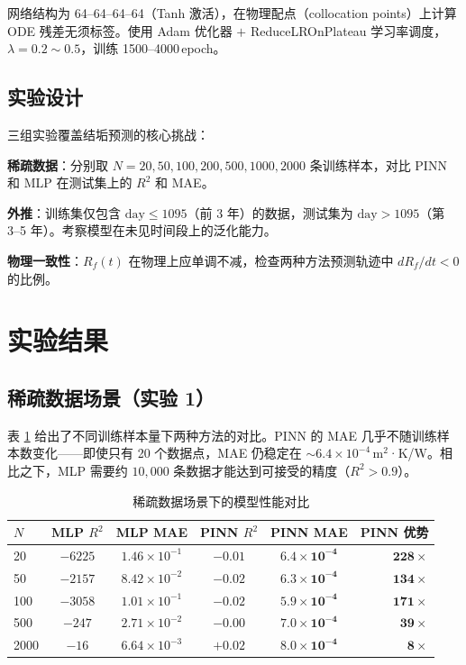 \documentclass[12pt,a4paper]{ctexart}
\begin{document}
网络结构为 64--64--64--64（Tanh 激活），在物理配点（collocation points）上计算 ODE 残差无须标签。使用 Adam 优化器 $+$ ReduceLROnPlateau 学习率调度，$\lambda=0.2\sim0.5$，训练 1500--4000\,epoch。

\subsection{实验设计}
\label{sec:exp_design}

三组实验覆盖结垢预测的核心挑战：

\begin{description}[leftmargin=!,labelwidth=4em,itemindent=0pt]
    \item[实验 1] \textbf{稀疏数据}：分别取 $N = 20, 50, 100, 200, 500, 1000, 2000$ 条训练样本，对比 PINN 和 MLP 在测试集上的 $R^2$ 和 MAE。
    \item[实验 2] \textbf{外推}：训练集仅包含 $\text{day} \leq 1095$（前 3 年）的数据，测试集为 $\text{day} > 1095$（第 3--5 年）。考察模型在未见时间段上的泛化能力。
    \item[实验 3] \textbf{物理一致性}：$R_f(t)$ 在物理上应单调不减，检查两种方法预测轨迹中 $dR_f/dt < 0$ 的比例。
\end{description}

\section{实验结果}
\label{sec:results}

\subsection{稀疏数据场景（实验 1）}

表 \ref{tab:sparse} 给出了不同训练样本量下两种方法的对比。PINN 的 MAE 几乎不随训练样本数变化——即使只有 20 个数据点，MAE 仍稳定在 $\sim 6.4\times10^{-4}$\,m$^2$·K/W。相比之下，MLP 需要约 $10{,}000$ 条数据才能达到可接受的精度（$R^2 > 0.9$）。

\begin{table}[htbp]
    \centering
    \caption{稀疏数据场景下的模型性能对比}
    \label{tab:sparse}
    \begin{tabular}{lccccr}
        \toprule
        $N$ & MLP $R^2$ & MLP MAE & PINN $R^2$ & PINN MAE & PINN 优势 \\
        \midrule
         20   & $-6225$  & $1.46\times10^{-1}$ & $-0.01$ & $\mathbf{6.4\times10^{-4}}$ & $\mathbf{228\times}$ \\
         50   & $-2157$  & $8.42\times10^{-2}$ & $-0.02$ & $\mathbf{6.3\times10^{-4}}$ & $\mathbf{134\times}$ \\
        100   & $-3058$  & $1.01\times10^{-1}$ & $-0.02$ & $\mathbf{5.9\times10^{-4}}$ & $\mathbf{171\times}$ \\
        500   & $-247$   & $2.71\times10^{-2}$ & $-0.00$ & $\mathbf{7.0\times10^{-4}}$ & $\mathbf{39\times}$  \\
       2000   & $-16$    & $6.64\times10^{-3}$ & $+0.02$ & $\mathbf{8.0\times10^{-4}}$ & $\mathbf{8\times}$   \\
        \bottomrule
    \end{tabular}
\end{table}
\end{document}
